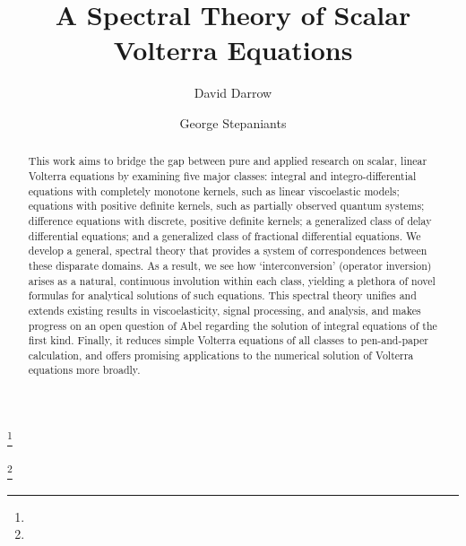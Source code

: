 \documentclass{cams-l} %
\newcommand{\dave}[1]{#1}\newcommand{\davebegin}{}\newcommand{\daveend}{}\newcommand{\george}[1]{#1}
\theoremstyle{definition}
\theoremstyle{remark}
\numberwithin{equation}{section}
\begin{document}
\title[A Spectral Theory of Scalar Volterra Equations]{A Spectral Theory of Scalar Volterra Equations}


\author{David Darrow}
\address{Department of Mathematics, Massachusetts Institute of Technology, Cambridge, MA}
\curraddr{}
\thanks{}

\author{George Stepaniants}
\address{Department of Computing and Mathematical Sciences, California Institute of Technology, Pasadena, CA}
\curraddr{}
\thanks{}


\date{}

\dedicatory{}

\begin{abstract}
This work aims to bridge the gap between pure and applied research on scalar, linear Volterra equations by examining five major classes: integral and integro-differential equations with completely monotone kernels, \dave{such as linear} viscoelastic models; equations with positive definite kernels, \dave{such as} partially observed quantum systems; difference equations with discrete, positive definite kernels; a generalized class of delay differential equations; and a generalized class of fractional differential equations. We develop a general, spectral theory that provides a system of correspondences between these disparate domains. As a result, we see how `interconversion' (operator inversion) arises as a natural, continuous involution within each class, yielding a plethora of novel formulas for analytical solutions of such equations. \dave{This spectral theory unifies and extends existing results in viscoelasticity, signal processing, and analysis, and makes progress on an open question of Abel regarding the solution of integral equations of the first kind. Finally, it reduces simple Volterra equations of all classes to pen-and-paper calculation, and offers promising applications to the numerical solution of Volterra equations more broadly.}
\end{abstract}
\end{document}
